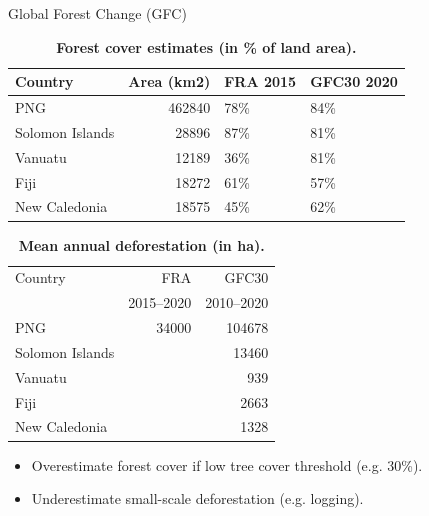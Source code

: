 \documentclass[10pt,table,dvipsnames,compress]{beamer}
\begin{document}
\begin{frame}[label={sec:org8dcd8c8}]{Global Forest Change (GFC)}
\begin{table}[htbp]
\caption{\textbf{Forest cover estimates (in \% of land area).}}
\centering
\footnotesize
\begin{tabular}{lrll}
Country & Area (km2) & FRA 2015 & GFC30 2020\\[0pt]
\hline
PNG & 462840 & 78\% & 84\%\\[0pt]
Solomon Islands & 28896 & 87\% & 81\%\\[0pt]
Vanuatu & 12189 & 36\% & 81\%\\[0pt]
Fiji & 18272 & 61\% & 57\%\\[0pt]
New Caledonia & 18575 & 45\% & 62\%\\[0pt]
\end{tabular}
\end{table}

\begin{table}[htbp]
\caption{\textbf{Mean annual deforestation (in ha).}}
\centering
\footnotesize
\begin{tabular}{lrr}
Country & FRA & GFC30\\[0pt]
 & 2015--2020 & 2010--2020\\[0pt]
\hline
PNG & 34000 & 104678\\[0pt]
Solomon Islands &  & 13460\\[0pt]
Vanuatu &  & 939\\[0pt]
Fiji &  & 2663\\[0pt]
New Caledonia &  & 1328\\[0pt]
\end{tabular}
\end{table}

\begin{itemize}
\item Overestimate forest cover if low tree cover threshold (e.g. 30\%).
\item Underestimate small-scale deforestation (e.g. logging).
\end{itemize}
\end{frame}
\end{document}
